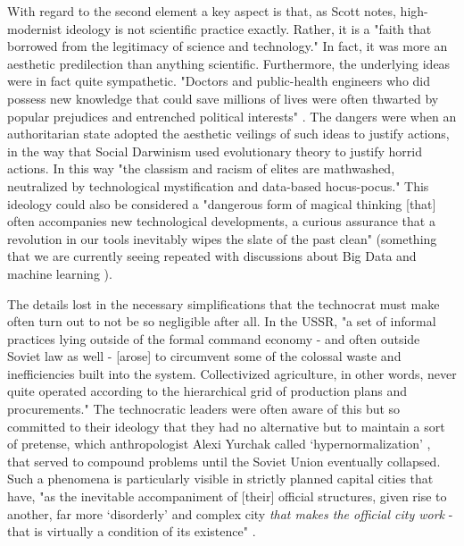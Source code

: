 With regard to the second element a key aspect is that, as Scott notes, high-modernist ideology is not scientific practice exactly. Rather, it is a "faith that borrowed from the legitimacy of science and technology." In fact, it was more an aesthetic predilection than anything scientific. Furthermore, the underlying ideas were in fact quite sympathetic. "Doctors and public-health engineers who did possess new knowledge that could save millions of lives were often thwarted by popular prejudices and entrenched political interests"  \cite{scottSeeingStateHow2020}. The dangers were when an authoritarian state adopted the aesthetic veilings of such ideas to justify actions, in the way that Social Darwinism used evolutionary theory to justify horrid actions. In this way "the classism and racism of elites are mathwashed, neutralized by technological mystification and data-based hocus-pocus." \cite{eubanksAutomatingInequalityHow2018} This ideology could also be considered a "dangerous form of magical thinking [that] often accompanies new technological developments, a curious assurance that a revolution in our tools inevitably wipes the slate of the past clean" \cite{eubanksAutomatingInequalityHow2018} (something that we are currently seeing repeated with discussions about Big Data and machine learning \cite{barnesBigDataSocial2014}).

The details lost in the necessary simplifications that the technocrat must make often turn out to not be so negligible after all. In the USSR, "a set of informal practices lying outside of the formal command economy - and often outside Soviet law as well - [arose] to circumvent some of the colossal waste and inefficiencies built into the system. Collectivized agriculture, in other words, never quite operated according to the hierarchical grid of production plans and procurements." \cite{scottSeeingStateHow2020} The technocratic leaders were often aware of this but so committed to their ideology that they had no alternative but to maintain a sort of pretense, which anthropologist Alexi Yurchak called `hypernormalization' \cite{yurchakEverythingWasForever2005}, that served to compound problems until the Soviet Union eventually collapsed. Such a phenomena is particularly visible in strictly planned capital cities that have, "as the inevitable accompaniment of [their] official structures, given rise to another, far more `disorderly' and complex city \textit{that makes the official city work} - that is virtually a condition of its existence" \cite{scottSeeingStateHow2020}.

